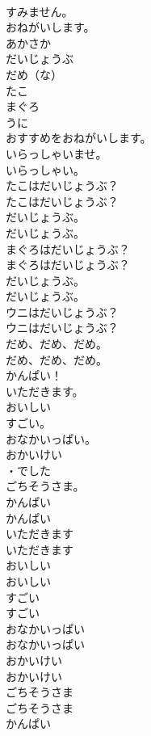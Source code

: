 \documentclass[8pt]{extreport}
\begin{document}
\begin{CJK}{UTF8}{min}
\\	すみません。
\\	おねがいします。
\\	あかさか
\\	だいじょうぶ
\\	だめ（な）
\\	たこ
\\	まぐろ
\\	うに
\\	おすすめをおねがいします。
\\	いらっしゃいませ。
\\	いらっしゃい。
\\	たこはだいじょうぶ？	
\\	たこはだいじょうぶ？ 
\\	だいじょうぶ。	
\\	だいじょうぶ。 
\\	まぐろはだいじょうぶ？	
\\	まぐろはだいじょうぶ？ 
\\	だいじょうぶ。	
\\	だいじょうぶ。 
\\	ウニはだいじょうぶ？	
\\	ウニはだいじょうぶ？ 
\\	だめ、だめ、だめ。	
\\	だめ、だめ、だめ。 
\\	かんぱい！
\\	いただきます。
\\	おいしい
\\	すごい。
\\	おなかいっぱい。
\\	おかいけい
\\	・でした 
\\	ごちそうさま。
\\	かんぱい	
\\	かんぱい 
\\	いただきます	
\\	いただきます 
\\	おいしい	
\\	おいしい 
\\	すごい	
\\	すごい 
\\	おなかいっぱい	
\\	おなかいっぱい 
\\	おかいけい	
\\	おかいけい 
\\	ごちそうさま	
\\	ごちそうさま 
\\	かんぱい	

\end{CJK}
\end{document}
